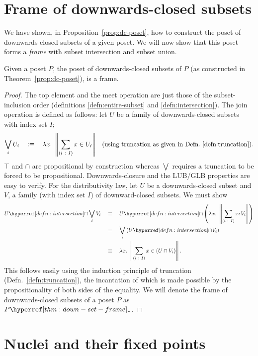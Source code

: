 \section{Frame of downwards-closed subsets}\label{sec:down-set-frame}

We have shown, in Proposition~\ref{prop:dc-poset}, how to construct the poset of
downwards-closed subsets of a given poset. We will now show that this poset forms a
\emph{frame} with subset intersection and subset union.

\begin{thm}\label{thm:down-set-frame}
  Given a poset $P$, the poset of downwards-closed subsets of $P$ (as constructed in
  Theorem~\ref{prop:dc-poset}), is a frame.
\end{thm}
\begin{proof}
  The top element and the meet operation are just those of the subset-inclusion order
  (definitions \ref{defn:entire-subset} and \ref{defn:intersection}). The join operation
  is defined as follows: let $U$ be a family of downwards-closed subsets with index set
  $I$;
  \begin{align*}
    \bigvee_i U_i \quad:\equiv\quad \lambda x.~ \left\| \sum_{(i~:~I)} x \in U_i \right\|
      && \text{(using truncation as given in Defn.~\ref{defn:truncation})}.
  \end{align*}
  $\top$ and $\cap$ are propositional by construction whereas $\bigvee$ requires a truncation to be
  forced to be propositional. Downwards-closure and the LUB/GLB properties are easy to
  verify. For the distributivity law, let $U$ be a downwards-closed subset and $V$, a
  family (with index set $I$) of downward-closed subsets. We must show
  \begin{align*}
    \intersect{U}{\bigvee_i V_i}
      \quad&\equiv\quad \intersect{U}{\left(\lambda x.~ \trunc{\sigmaty{i}{I}{x \epsilon V_i}}\right)}\\
      \quad&=\quad \bigvee_i \left(\intersect{U}{V_i} \right)\\
      \quad&\equiv\quad \lambda x.~ \trunc{\sigmaty{i}{I}{x \in (U \cap V_i)}}.
  \end{align*}
  This follows easily using the induction principle of truncation
  (Defn.~\ref{defn:truncation}), the incantation of which is made possible by the
  propositionality of both sides of the equality. We will denote the frame of
  downwards-closed subsets of a poset $P$ as $\dcframe{P}$.
\end{proof}

\section{Nuclei and their fixed points}\label{sec:nuclei}


